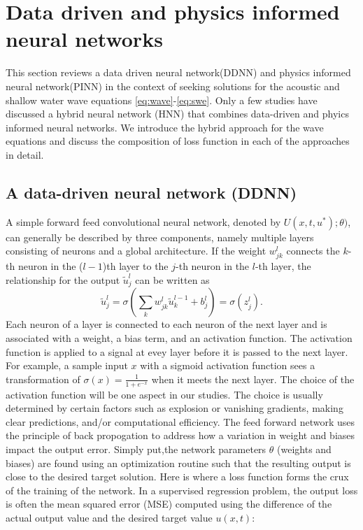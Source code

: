 \section{Data driven and physics informed neural networks}
\label{sec:neuralnets}
This section reviews a data driven neural network(DDNN) and physics informed neural network(PINN) in the context of seeking solutions for the acoustic and shallow water wave equations \ref{eq:wave}-\ref{eq:swe}. Only a few studies have discussed a hybrid neural network (HNN) that combines data-driven and phyics informed neural networks. We introduce the hybrid approach for the wave equations and discuss the composition of loss function in each of the approaches in detail.

\subsection{A data-driven neural network (DDNN)}
\label{sec:vanillaNN}
A simple forward feed convolutional neural network, denoted by $U(x, t, u^*); \theta)$, can generally be described by three components, namely  multiple layers consisting of neurons and a global architecture. If the weight $w_{jk}^l$ connects the $k$-th neuron in the ($l-1$)th layer to the $j$-th neuron in the $l$-th layer, the relationship for the output $\tilde{u}_j^l$ can be written as
\[
\tilde{u}_j^l = \sigma\left(\sum_k w^l_{jk} \tilde{u}_k ^{l-1} + b_j^l\right) =  \sigma\left(z_j^l\right).
\]
Each neuron of a layer is connected to each neuron of the next layer and is associated with a weight, a bias term, and an activation function. The  activation function is applied to a signal at evey layer before it is passed to the next layer. For example, a sample input $x$ with a sigmoid activation function sees a transformation of $\sigma(x) = \frac{1}{1+e^{-x}}$ when it meets the next layer. The choice of the activation function will be one aspect in our studies. The choice is usually determined by certain factors such as explosion or vanishing gradients, making clear predictions, and/or computational efficiency.
%
The feed forward network uses the principle of back propogation to address how a variation in weight and biases impact the output error. Simply put,the network parameters $\theta$ (weights and biases) are found using an optimization routine such that the resulting output is close to the desired target solution. Here is where a loss function forms the crux of the training of the network. In a supervised regression problem, the output loss is often the mean squared error (MSE) computed using the difference of the actual output value and the desired target value $u(x,t)$:
